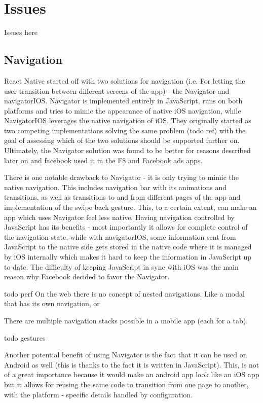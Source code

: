 \section{Issues}

Issues here

\subsection{Navigation}

React Native started off with two solutions for navigation (i.e. For letting the user transition between different screens of the app) - the Navigator and navigatorIOS. Navigator is implemented entirely in JavaScript, runs on both platforms and tries to mimic the appearance of native iOS navigation, while NavigatorIOS leverages the native navigation of iOS.
They originally started as two competing implementations solving the same problem (todo ref) with the goal of assessing which of the two solutions should be supported further on. Ultimately, the Navigator solution was found to be better for reasons described later on and facebook used it in the F8 and Facebook ads apps. 


There is one notable drawback to Navigator - it is only trying to mimic the native navigation. This includes navigation bar with its animations and transitions, as well as transitions to and from different pages of the app and implementation of the swipe back gesture. This, to a certain extent, can make an app which uses Navigator feel less native.
Having navigation controlled by JavaScript has its benefits - most importantly it allows for complete control of the navigation state, while with navigatorIOS, some information sent from JavaScript to the native side gets stored in the native code where it is managed by iOS internally which makes it hard to keep the information in JavaScript up to date. The difficulty of keeping JavaScript in sync with iOS was the main reason why Facebook decided to favor the Navigator. 


todo perf
On the web there is no concept of nested navigations. Like a modal that has its own navigation, or

There are multiple navigation stacks possible in a mobile app (each for a tab).

todo gestures

Another potential benefit of using Navigator is the fact that it can be used on Android as well (this is thanks to the fact it is written in JavaScript). This, is not of a great importance because it would make an android app look like an iOS app but it allows for reusing the same code to transition from one page to another, with the platform - specific details handled by configuration. 


